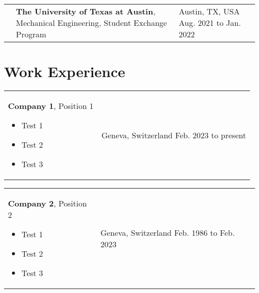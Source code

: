 \documentclass[10pt, a4paper]{article}
\newenvironment{highlights}{
        \begin{itemize}[
                topsep=0pt,
                parsep=0.07 cm,
                partopsep=0pt,
                itemsep=0pt,
                after=\vspace*{-1\baselineskip},
                leftmargin=0.6 cm + 3pt
            ]
    }{
        \end{itemize}
    } %
\begin{document}
        \vspace*{0.12 cm}
        
        \begin{tabularx}{ cm-0.13cm}{L{0.85cm} K{0.2 cm} R{3.6 cm}}
            \textbf{}
            & 
            \textbf{The University of Texas at Austin}, Mechanical Engineering, Student Exchange Program
            \vspace*{0.12 cm}
        &
            Austin, TX, USA \newline
            Aug. 2021 to Jan. 2022
        \end{tabularx}



    \section{Work Experience}
    
        \begin{tabularx}{ cm-0.13cm}{K{0.2 cm} R{3.6 cm}}
            \textbf{Company 1}, Position 1
            \vspace*{0.12 cm}
            \begin{highlights}
                \item Test 1
                \item Test 2
                \item Test 3
            \end{highlights}
        &
            Geneva, Switzerland \newline
            Feb. 2023 to present
        \end{tabularx}

        \vspace*{0.12 cm}
        
        \begin{tabularx}{ cm-0.13cm}{K{0.2 cm} R{3.6 cm}}
            \textbf{Company 2}, Position 2
            \vspace*{0.12 cm}
            \begin{highlights}
                \item Test 1
                \item Test 2
                \item Test 3
            \end{highlights}
        &
            Geneva, Switzerland \newline
            Feb. 1986 to Feb. 2023
        \end{tabularx}
\end{document}
